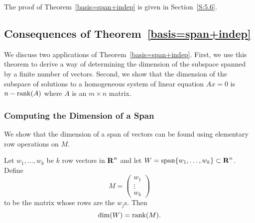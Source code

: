 \documentclass{ximera}
\begin{document}
The proof of Theorem~\ref{basis=span+indep} is given in Section~\ref{S:5.6}.


\subsection*{Consequences of Theorem~\protect\ref{basis=span+indep}}

We discuss two applications of Theorem~\ref{basis=span+indep}.  First,
we use this theorem to derive a way of determining the dimension of the
subspace spanned by a finite number of vectors.  Second, we show that the
dimension of the subspace of solutions to a homogeneous system of linear
equation $Ax=0$ is $n-{\rm rank}(A)$ where $A$ is an $m\times n$ matrix.

\subsubsection*{Computing the Dimension of a Span} 

We show that the dimension of a span of vectors can be found using
elementary row operations on $M$. 

\begin{lemma}  \label{L:computerank}
Let $w_1,\ldots,w_k$ be $k$ row vectors in $\mbox{$\bf{R}$}^n$ and let
$W={\rm span}\{w_1,\ldots,w_k\}\subset\mbox{$\bf{R}$}^n$.  Define
\[
M =\left(\begin{array}{c} w_1\\ \vdots \\w_k \end{array}\right)
\]
to be the matrix whose rows are the $w_j$s.  Then
\begin{equation}  \label{e:dimW=rankM}
\dim(W) = \rank(M).
\end{equation}
\end{lemma}
\end{document}
